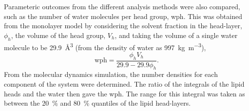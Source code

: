 \documentclass[amsmath,amssymb,twocolumn,superscriptaddress]{revtex4-1}
\begin{document}
Parameteric outcomes from the different analysis methods were also compared,
such as the number of water molecules per head group, wph.
This was obtained from the monolayer model by considering the solvent
fraction in the head-layer, $\phi_h$, the volume of the head group, $V_h$,
and taking the volume of a single water molecule to be
\SI{29.9}{\cubic\angstrom} (from the density of water as
\SI{997}{\kilo\gram\per\cubic\meter}),
%
\begin{equation}
  \text{wph} = \frac{\phi_hV_h}{29.9 - 29.9\phi_h}.
  \label{equ:wph}
\end{equation}
%
From the molecular dynamics simulation, the number densities for each
component of the system were determined.
The ratio of the integrals of the lipid heads and the water then gave the
wph.
The range for this integral was taken as between the \SI{20}{\percent} and
\SI{80}{\percent} quantiles of the lipid head-layers.
\end{document}
